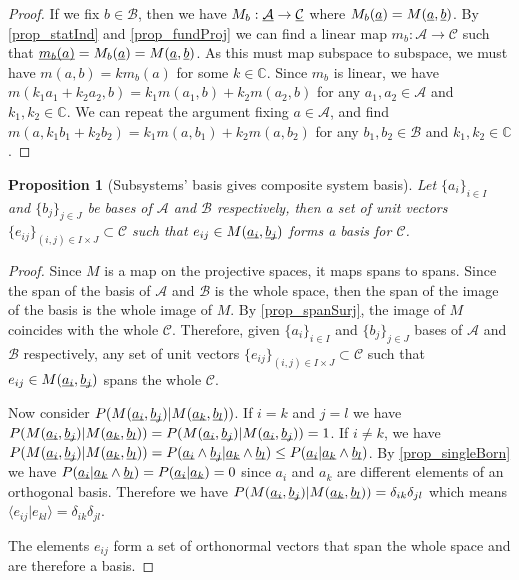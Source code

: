 \documentclass[aps,prl,amsmath,amssymb,twocolumn,nofootinbib]{revtex4}
\theoremstyle{plain}
\newtheorem{prop}[thrm]{Proposition}
\theoremstyle{definition}
\theoremstyle{remark}
\newcommand{\pj}[1] {\underbar{$#1$}}
\def\>{\rangle}
\def\<{\langle}
\begin{document}
\begin{proof}
  If we fix $b \in \mathcal{B}$, then we have $M_b : \pj{\mathcal{A}} \to \pj{\mathcal{C}}$ where $M_b(\pj{a}) = M(\pj{a}, \pj{b})$. By \ref{prop_statInd} and \ref{prop_fundProj} we can find a linear map $m_b : \mathcal{A} \to \mathcal{C}$ such that $\pj{m_b(a)} = M_b(\pj{a}) = M(\pj{a}, \pj{b})$. As this must map subspace to subspace, we must have $m(a, b) = k m_b(a)$ for some $k \in \mathbb{C}$. Since $m_b$ is linear, we have $m(k_1a_1 + k_2a_2, b)=k_1m(a_1, b) + k_2m(a_2, b)$ for any $a_1, a_2 \in \mathcal{A}$ and $k_1, k_2 \in \mathbb{C}$. We can repeat the argument fixing $a \in \mathcal{A}$, and find $m(a, k_1b_1 + k_2b_2)=k_1m(a, b_1) + k_2m(a, b_2)$ for any $b_1, b_2 \in \mathcal{B}$ and $k_1, k_2 \in \mathbb{C}$.
\end{proof}

\begin{prop}[Subsystems' basis gives composite system
  basis]\label{prop_basis}
  Let $\{a_i\}_{i\in I}$ and $\{b_j\}_{j \in J}$ be bases of $\mathcal{A}$ and $\mathcal{B}$ respectively, then a set of unit vectors $\{e_{ij}\}_{(i,j) \in I \times J} \subset \mathcal{C}$  such that $e_{ij} \in M(\underbar{$a_i$}, \underbar{$b_j$})$ forms a basis for $\mathcal{C}$.
\end{prop}

\begin{proof}
  
  Since $M$ is a map on the projective spaces, it maps spans to spans.
  Since the span of the basis of $\mathcal{A}$ and $\mathcal{B}$ is
  the whole space, then the span of the image of the basis is the
  whole image of $M$. By \ref{prop_spanSurj}, the image of $M$
  coincides with the whole $\mathcal{C}$. Therefore, given
  $\{a_i\}_{i\in I}$ and $\{b_j\}_{j \in J}$ bases of $\mathcal{A}$
  and $\mathcal{B}$ respectively, any set of unit vectors
  $\{e_{ij}\}_{(i,j) \in I \times J} \subset \mathcal{C}$ such that
  $e_{ij} \in M(\pj{a_i}, \pj{b_j})$ spans the whole $\mathcal{C}$.
  
  Now consider $P(M(\pj{a_i},\pj{b_j})|M(\pj{a_k},\pj{b_l}))$. If $i=k$ and $j=l$ we have $P(M(\pj{a_i},\pj{b_j})|M(\pj{a_k},\pj{b_l}))= P(M(\pj{a_i},\pj{b_j})|M(\pj{a_i},\pj{b_j})) = 1$. If $i\neq k$, we have $P(M(\pj{a_i},\pj{b_j})|M(\pj{a_k},\pj{b_l})) = P(\pj{a_i} \wedge \pj{b_j} | \pj{a_k} \wedge \pj{b_l}) \leq P(\pj{a_i} | \pj{a_k} \wedge \pj{b_l})$. By \ref{prop_singleBorn} we have $P(\pj{a_i} | \pj{a_k} \wedge \pj{b_l}) = P(\pj{a_i} | \pj{a_k}) = 0$ since $a_i$ and $a_k$ are different elements of an orthogonal basis. Therefore we have $P(M(\pj{a_i},\pj{b_j})|M(\pj{a_k},\pj{b_l}))=\delta_{ik}\delta_{jl}$ which means $\<e_{ij} | e_{kl} \> = \delta_{ik}\delta_{jl}$.

  The elements $e_{ij}$ form a set of orthonormal vectors that span the whole space and are therefore a basis.
\end{proof}
\end{document}

